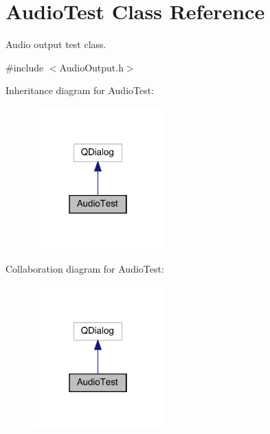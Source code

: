 \hypertarget{class_audio_test}{}\section{Audio\+Test Class Reference}
\label{class_audio_test}


Audio output test class.  




{\ttfamily \#include $<$Audio\+Output.\+h$>$}



Inheritance diagram for Audio\+Test\+:
\nopagebreak
\begin{figure}[H]
\begin{center}
\leavevmode
\includegraphics[width=142pt]{class_audio_test__inherit__graph}
\end{center}
\end{figure}


Collaboration diagram for Audio\+Test\+:
\nopagebreak
\begin{figure}[H]
\begin{center}
\leavevmode
\includegraphics[width=142pt]{class_audio_test__coll__graph}
\end{center}
\end{figure}
